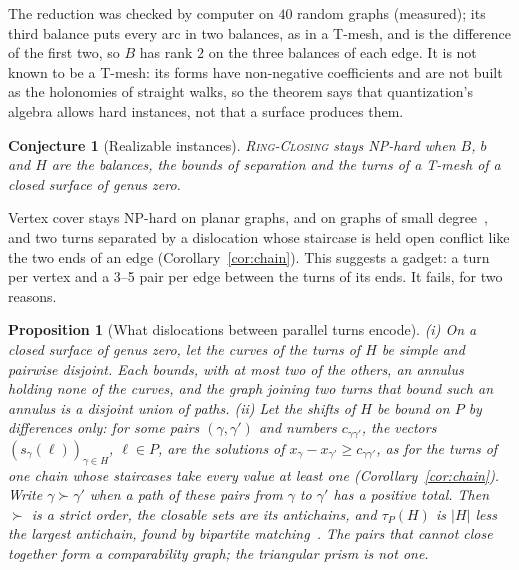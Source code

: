 \documentclass[11pt,a4paper]{article}
\newtheorem{proposition}{Proposition}
\newtheorem{conjecture}{Conjecture}
\newcommand{\shift}{s}
\newcommand{\RC}{\textup{\textsc{Ring-Closing}}}
\newenvironment{evidence}[3][]{}{}
\begin{document}
The reduction was checked by computer on $40$ random graphs (measured); its
third balance puts every arc in two balances, as in a T-mesh, and is the
difference of the first two, so $B$ has rank $2$ on the three balances of
each edge. It is not known
to be a T-mesh: its forms have non-negative coefficients and are not built as
the holonomies of straight walks, so the theorem says that quantization's
algebra allows hard instances, not that a surface produces them.

\begin{evidence}{open}{}
\begin{conjecture}[Realizable instances]\label{conj:realize}
\RC{} stays NP-hard when $B$, $b$ and $H$ are the balances, the bounds of
separation and the turns of a T-mesh of a closed surface of genus zero.
\end{conjecture}
\end{evidence}

Vertex cover stays NP-hard on planar graphs, and on graphs of small
degree~\cite{garey1976simplified}, and two turns separated by a dislocation
whose staircase is held open conflict like the two ends of an edge
(Corollary~\ref{cor:chain}). This suggests a gadget: a turn per vertex and a
3--5 pair per edge between the turns of its ends. It fails, for two reasons.

\begin{evidence}{prose}{(ii) checked by computer on $K_4$, the triangular prism, the cube and the pentagonal prism: for every orientation of their edges, the closable sets of the differences against the independent sets, and the implication classes (\texttt{experiments/gadget.py})}
\begin{proposition}[What dislocations between parallel turns encode]\label{prop:differences}
(i) On a closed surface of genus zero, let the curves of the turns of $H$ be
simple and pairwise disjoint. Each bounds, with at most two of the others, an
annulus holding none of the curves, and the graph joining two turns that bound
such an annulus is a disjoint union of paths.
(ii) Let the shifts of $H$ be bound on $P$ by differences only: for some pairs
$(\gamma, \gamma')$ and numbers $c_{\gamma\gamma'}$, the vectors
$(\shift_\gamma(\ell))_{\gamma \in H}$, $\ell \in P$, are the solutions of
$x_\gamma - x_{\gamma'} \ge c_{\gamma\gamma'}$, as for the turns of one chain
whose staircases take every value at least one (Corollary~\ref{cor:chain}).
Write $\gamma \succ \gamma'$ when a path of these pairs from $\gamma$ to
$\gamma'$ has a positive total. Then $\succ$ is a strict order, the closable
sets are its antichains, and $\tau_P(H)$ is $|H|$ less the largest antichain,
found by bipartite matching~\cite{dilworth1950decomposition,fulkerson1956note}.
The pairs that cannot close together form a comparability graph; the
triangular prism is not one.
\end{proposition}
\end{evidence}
\end{document}
